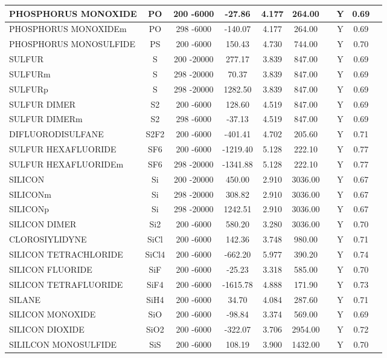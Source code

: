 \begin{longtable}{@{\extracolsep{\fill}}|l|c|c|c|c|c|c|c|c|l|}
PHOSPHORUS MONOXIDE&PO&200 -6000&  -27.86& 4.177&   264.00& &Y& 0.69&\\ \hline
PHOSPHORUS MONOXIDEm&PO&298 -6000& -140.07& 4.177&   264.00& &Y& 0.69&\\ \hline
PHOSPHORUS MONOSULFIDE&PS&200 -6000&  150.43& 4.730&   744.00& &Y& 0.70&\\ \hline
SULFUR&S&200 -20000&  277.17& 3.839&   847.00& &Y& 0.69&\\ \hline
SULFURm&S&298 -20000&   70.37& 3.839&   847.00& &Y& 0.69&\\ \hline
SULFURp&S&298 -20000& 1282.50& 3.839&   847.00& &Y& 0.69&\\ \hline
SULFUR DIMER&S2&200 -6000&  128.60& 4.519&   847.00& &Y& 0.69&\\ \hline
SULFUR DIMERm&S2&298 -6000&  -37.13& 4.519&   847.00& &Y& 0.69&\\ \hline
DIFLUORODISULFANE&S2F2&200 -6000& -401.41& 4.702&   205.60& &Y& 0.71&\\ \hline
SULFUR HEXAFLUORIDE&SF6&200 -6000&-1219.40& 5.128&   222.10& &Y& 0.77&\\ \hline
SULFUR HEXAFLUORIDEm&SF6&298 -20000&-1341.88& 5.128&   222.10& &Y& 0.77&\\ \hline
SILICON&Si&200 -20000&  450.00& 2.910&  3036.00& &Y& 0.67&\\ \hline
SILICONm&Si&298 -20000&  308.82& 2.910&  3036.00& &Y& 0.67&\\ \hline
SILICONp&Si&298 -20000& 1242.51& 2.910&  3036.00& &Y& 0.67&\\ \hline
SILICON DIMER&Si2&200 -6000&  580.20& 3.280&  3036.00& &Y& 0.70&\\ \hline
CLOROSIYLIDYNE&SiCl&200 -6000&  142.36& 3.748&   980.00& &Y& 0.71&\\ \hline
SILICON TETRACHLORIDE&SiCl4&200 -6000& -662.20& 5.977&   390.20& &Y& 0.74&\\ \hline
SILICON FLUORIDE&SiF&200 -6000&  -25.23& 3.318&   585.00& &Y& 0.70&\\ \hline
SILICON TETRAFLUORIDE&SiF4&200 -6000&-1615.78& 4.888&   171.90& &Y& 0.73&\\ \hline
SILANE&SiH4&200 -6000&   34.70& 4.084&   287.60& &Y& 0.71&\\ \hline
SILICON MONOXIDE&SiO&200 -6000&  -98.84& 3.374&   569.00& &Y& 0.69&\\ \hline
SILICON DIOXIDE&SiO2&200 -6000& -322.07& 3.706&  2954.00& &Y& 0.72&\\ \hline
SILILCON MONOSULFIDE&SiS&200 -6000&  108.19& 3.900&  1432.00& &Y& 0.70&\\ \hline

\end{longtable}
